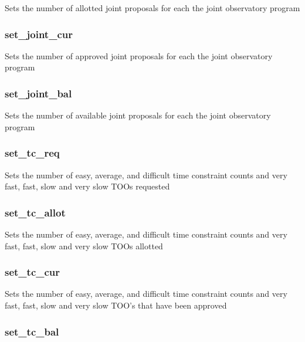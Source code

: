 \documentclass{article}
\begin{document}
Sets the number of allotted joint proposals for each the joint observatory
program

\subsubsection*{set\_joint\_cur\label{Panel_set_joint_cur}}


Sets the number of approved joint proposals for each the joint observatory
program

\subsubsection*{set\_joint\_bal\label{Panel_set_joint_bal}}


Sets the number of available joint proposals for each the joint observatory
program

\subsubsection*{set\_tc\_req\label{Panel_set_tc_req}}


Sets the number of easy, average, and difficult time constraint counts and 
very fast, fast, slow and very slow TOOs requested

\subsubsection*{set\_tc\_allot\label{Panel_set_tc_allot}}


Sets the number of easy, average, and difficult time constraint counts and 
very fast, fast, slow and very slow TOOs allotted

\subsubsection*{set\_tc\_cur\label{Panel_set_tc_cur}}


Sets the number of easy, average, and difficult time constraint counts and 
very fast, fast, slow and very slow TOO's that have been
approved

\subsubsection*{set\_tc\_bal\label{Panel_set_tc_bal}}
\end{document}
